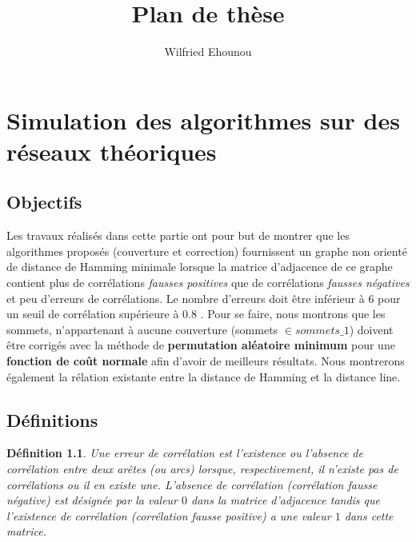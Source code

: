 \documentclass[onecolumn, 12pt]{book}
\title{Plan de th\`ese}
\author{Wilfried Ehounou}
\date{\oldstylenums{\today}}
\newtheorem{definition}{D\'efinition}
\begin{document}
\maketitle
\tableofcontents

\chapter{Simulation des algorithmes sur des r\'eseaux th\'eoriques}

\section{Objectifs}
Les travaux r\'ealis\'es dans cette partie ont pour but de montrer que les algorithmes propos\'es (couverture et correction) fournissent un graphe non orient\'e de distance de Hamming minimale lorsque la matrice d'adjacence de ce graphe contient plus de corr\'elations {\em fausses positives} que de corr\'elations {\em fausses n\'egatives} et peu d'erreurs de corr\'elations. Le nombre d'erreurs  doit \^etre inf\'erieur \`a $6$ pour un seuil de corr\'elation sup\'erieure \`a $0.8$ . 
Pour se faire, nous montrons que les sommets, n'appartenant \`a aucune couverture (sommets $\in sommets\_1$) doivent \^etre corrig\'es avec la m\'ethode de {\bf permutation al\'eatoire minimum} pour une {\bf fonction de co\^ut normale} afin d'avoir de meilleurs r\'esultats.
Nous montrerons \'egalement la r\'elation existante entre la distance de Hamming et la distance line.

\section{D\'efinitions}
\begin{definition}
Une {\em erreur de corr\'elation} est l'existence ou l'absence de corr\'elation entre deux ar\^etes (ou arcs) lorsque, respectivement, il n'existe pas de corr\'elations ou il en existe une.
\newline
L'absence de corr\'elation (corr\'elation {\em fausse n\'egative}) est d\'esign\'ee par la valeur $0$ dans la matrice d'adjacence tandis que l'existence de corr\'elation (corr\'elation {\em fausse positive}) a une valeur $1$ dans cette matrice. 
\end{definition}
\end{document}
